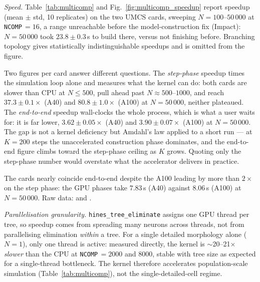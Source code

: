 \documentclass[preprint,12pt, a4paper]{elsarticle}
\newcommand{\hte}{\texttt{hines\_\allowbreak tree\_\allowbreak eliminate}}
\begin{document}
\begin{enumerate}
\emph{Speed.} Table~\ref{tab:multicomp} and Fig.~\ref{fig:multicomp_speedup} report speedup (mean $\pm$ std, 10 replicates) on the two UMCS cards, sweeping $N=100$--$50\,000$ at \texttt{NCOMP}\,$=16$, a range unreachable before the model-construction fix (Impact): $N=50\,000$ took $23.8\pm0.3$\,s to build there, versus not finishing before. Branching topology gives statistically indistinguishable speedups and is omitted from the figure.

Two figures per card answer different questions. The \emph{step-phase} speedup times the simulation loop alone and measures what the kernel can do: both cards are slower than CPU at $N\leq500$, pull ahead past $N\approx500$--$1000$, and reach $37.3\pm0.1\times$ (A40) and $80.8\pm1.0\times$ (A100) at $N=50\,000$, neither plateaued. The \emph{end-to-end} speedup wall-clocks the whole process, which is what a user waits for: it is far lower, $3.62\pm0.05\times$ (A40) and $3.90\pm0.07\times$ (A100) at $N=50\,000$. The gap is not a kernel deficiency but Amdahl's law applied to a short run --- at $K=200$ steps the unaccelerated construction phase dominates, and the end-to-end figure climbs toward the step-phase ceiling as $K$ grows. Quoting only the step-phase number would overstate what the accelerator delivers in practice.

The cards nearly coincide end-to-end despite the A100 leading by more than $2\times$ on the step phase: the GPU phases take $7.83$\,s (A40) against $8.06$\,s (A100) at $N=50\,000$. Raw data: \protect{} and \protect{}.

\emph{Parallelisation granularity.} \hte{} assigns one GPU thread per tree, so speedup comes from spreading many neurons across threads, not from parallelising elimination \emph{within} a tree. For a single detailed morphology alone ($N=1$), only one thread is active: measured directly, the kernel is $\sim$20--21$\times$ \emph{slower} than the CPU at \texttt{NCOMP}\,$=2000$ and $8000$, stable with tree size as expected for a single-thread bottleneck. The kernel therefore accelerates population-scale simulation (Table~\ref{tab:multicomp}), not the single-detailed-cell regime.


\end{enumerate}
\end{document}
